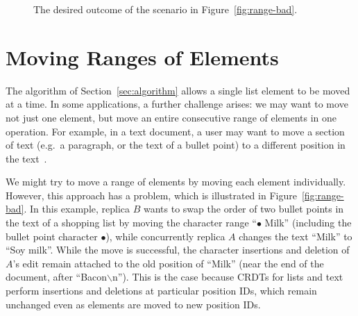 \documentclass[sigplan,10pt]{acmart}
\begin{document}
\begin{figure}
    \caption{The desired outcome of the scenario in Figure~\ref{fig:range-bad}.}
    \label{fig:range-good}
\end{figure}

\section{Moving Ranges of Elements}\label{sec:ranges}

The algorithm of Section~\ref{sec:algorithm} allows a single list element to be moved at a time.
In some applications, a further challenge arises: we may want to move not just one element, but move an entire consecutive range of elements in one operation.
For example, in a text document, a user may want to move a section of text (e.g.\ a paragraph, or the text of a bullet point) to a different position in the text~\cite{Lord:2019bo}.

We might try to move a range of elements by moving each element individually.
However, this approach has a problem, which is illustrated in Figure~\ref{fig:range-bad}.
In this example, replica $B$ wants to swap the order of two bullet points in the text of a shopping list by moving the character range ``$\bullet$ Milk'' (including the bullet point character $\bullet$), while concurrently replica $A$ changes the text ``Milk'' to ``Soy milk''.
While the move is successful, the character insertions and deletion of $A$'s edit remain attached to the old position of ``Milk'' (near the end of the document, after ``Bacon$\backslash$n'').
This is the case because CRDTs for lists and text perform insertions and deletions at particular position IDs, which remain unchanged even as elements are moved to new position IDs.
\end{document}
